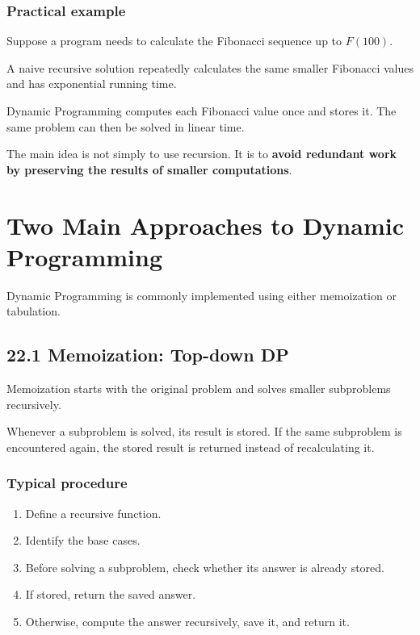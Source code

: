 \subsubsection{Practical example}

Suppose a program needs to calculate the Fibonacci sequence up to $F(100)$.

A naive recursive solution repeatedly calculates the same smaller Fibonacci values and has exponential running time.

Dynamic Programming computes each Fibonacci value once and stores it. The same problem can then be solved in linear time.

The main idea is not simply to use recursion. It is to \textbf{avoid redundant work by preserving the results of smaller computations}.

\section{Two Main Approaches to Dynamic Programming}

Dynamic Programming is commonly implemented using either memoization or tabulation.

\subsection{22.1 Memoization: Top-down DP}

Memoization starts with the original problem and solves smaller subproblems recursively.

Whenever a subproblem is solved, its result is stored. If the same subproblem is encountered again, the stored result is returned instead of recalculating it.

\subsubsection{Typical procedure}

\begin{enumerate}
    \item Define a recursive function.
    \item Identify the base cases.
    \item Before solving a subproblem, check whether its answer is already stored.
    \item If stored, return the saved answer.
    \item Otherwise, compute the answer recursively, save it, and return it.
\end{enumerate}

